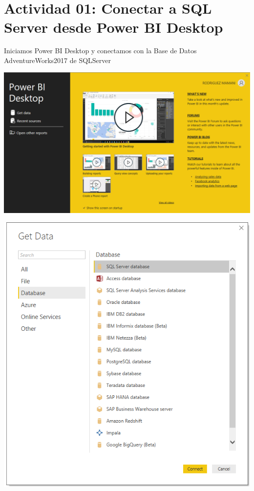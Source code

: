 \section{Actividad 01: Conectar a SQL Server desde Power BI Desktop } 

Iniciamos Power BI Desktop y conectamos con la Base de Datos AdventureWorks2017 de SQLServer

	\begin{center}
	\includegraphics[width=17cm]{./Imagenes/imagen1}
	\end{center}	

	\begin{center}
	\includegraphics[width=17cm]{./Imagenes/imagen2}
	\end{center}

